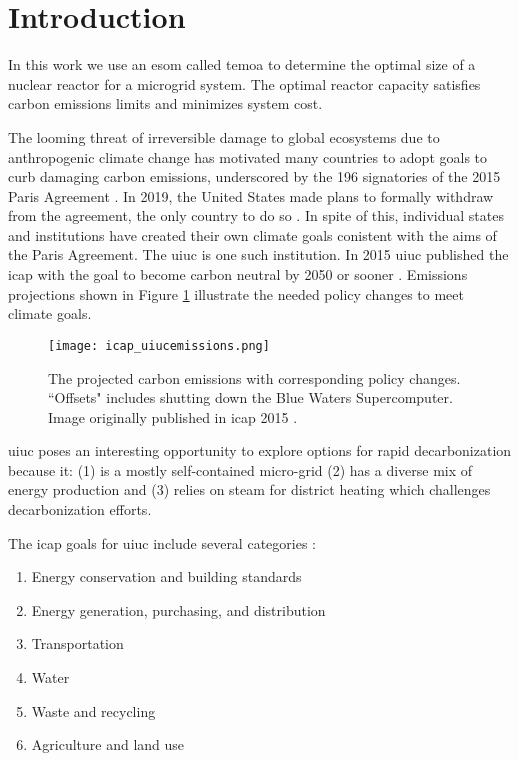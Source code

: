 \section{Introduction}

In this work we use an \gls{esom} called \gls{temoa} to determine the optimal
size of a nuclear reactor for a microgrid system. The optimal reactor capacity
satisfies carbon emissions limits and minimizes system cost.


The looming threat of irreversible damage to global ecosystems due to
anthropogenic climate change has motivated many countries to adopt goals to
curb damaging carbon emissions, underscored by the 196 signatories of the 2015
Paris Agreement \cite{noauthor_paris_nodate}. In 2019, the United States made
plans to formally withdraw from the agreement, the only country to do so
\cite{eshraghi_us_2018}. In spite of
this, individual states and institutions have created their own climate goals
conistent with the aims of the Paris Agreement. The \gls{uiuc} is one such
institution. In 2015 \gls{uiuc} published the \gls{icap} with the goal to
become carbon neutral by 2050 or sooner \cite{isee_illinois_2015}. Emissions
projections shown in Figure \ref{fig:icap_emissions} illustrate the needed
policy changes to meet climate goals.

\begin{figure}[ht!]
  \centering
  \texttt{[image: icap\_uiucemissions.png]}
  \caption{The projected carbon emissions with corresponding policy changes.
  ``Offsets" includes shutting down the Blue Waters Supercomputer. Image
  originally published in \gls{icap} 2015 \cite{isee_illinois_2015}.}
  \label{fig:icap_emissions}
\end{figure}

\gls{uiuc} poses an interesting opportunity to explore options for rapid
decarbonization because it: (1) is a mostly self-contained micro-grid (2) has a
diverse mix of energy production and (3) relies on steam for district heating
which challenges decarbonization efforts.


The \gls{icap} goals for \gls{uiuc} include several categories
\cite{isee_illinois_2015}:
\begin{enumerate}
  \item Energy conservation and building standards
  \item Energy generation, purchasing, and distribution
  \item Transportation
  \item Water
  \item Waste and recycling
  \item Agriculture and land use
\end{enumerate}

